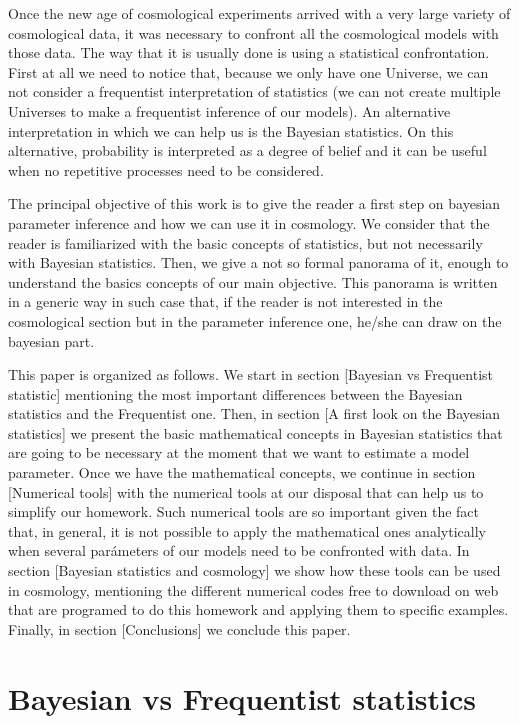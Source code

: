 \documentclass[onecolumn,           %
               showpacs,            %
               preprintnumbers,     %
               aps,                 %
               prl,          	    %
               letterpaper,             %
               superscriptaddress,      %
               nofootinbib,         %
               tightenlines,        %
               floats,floatfix      %
               ,usenatbib,
               ]{revtex4-1}
\begin{document}
Once the new age of cosmological experiments arrived with a very large variety of cosmological data, it was necessary to confront all the cosmological models with those data. The way that it is usually done is using a statistical confrontation. First at all we need to notice that, because we only have one Universe, we can not consider a frequentist interpretation of statistics (we can not create multiple Universes to make a frequentist inference of our models). An alternative interpretation in which we can help us is the Bayesian statistics. On this alternative, probability is interpreted as a degree of belief and it can be useful when no repetitive processes need to be considered.  

The principal objective of this work is to give the reader a first step on bayesian parameter inference and how we can use it in cosmology. We consider that the reader is familiarized with the basic concepts of statistics, but not necessarily with Bayesian statistics. Then, we give a not so formal panorama of it, enough to understand the basics concepts of our main objective. This panorama is written in a generic way in  such case that, if the reader is not interested in the cosmological section but in the parameter inference one, he/she can draw on the bayesian part.  

This paper is organized as follows. We start in section [Bayesian vs Frequentist statistic] mentioning the most important differences between the Bayesian statistics and the Frequentist one. Then, in section [A first look on the Bayesian statistics] we present the basic mathematical concepts in Bayesian statistics that are going to be necessary at the moment that we want to estimate a model parameter. Once we have the mathematical concepts, we continue in section [Numerical tools] with the numerical tools at our disposal that can help us to simplify our homework. Such numerical tools are so important given the fact that, in general, it is not possible to apply the mathematical ones analytically when several parámeters of our models need to be confronted with data. In section [Bayesian statistics and cosmology] we show how these tools can be used in cosmology, mentioning the different numerical codes free to download on web that are programed to do this homework and applying them to specific examples. Finally, in section [Conclusions] we conclude this paper.

\section{Bayesian vs Frequentist statistics}
\end{document}

